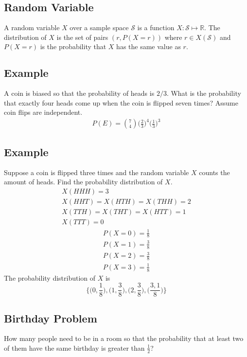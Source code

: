 \documentclass{article}
\theoremstyle{mytheoremstyle}
\theoremstyle{mytheoremstyle}
\theoremstyle{myproblemstyle}
\begin{document}
    \subsection*{Random Variable}
    A random variable $X$ over a sample space $\mathcal{S}$ is a function $X:
    \mathcal{S} \mapsto \mathbb{R}$. The distribution of $X$ is the set of pairs
    $(r,P(X=r))$ where $r\in X(\mathcal{S})$ and $P(X=r)$ is the probability
    that $X$ has the same value as $r$.

    \subsection*{Example}
    A coin is biased so that the probability of heads is $2/3$. What is the
    probability that exactly four heads come up when the coin is flipped seven
    times? Assume coin flips are independent.
    \begin{align*}
        P(E) = \binom{7}{4} \Big(\frac{2}{3}\Big)^4 \Big(\frac{1}{3}\Big)^3
    \end{align*}

    \subsection*{Example}
    Suppose a coin is flipped three times and the random variable $X$ counts the
    amount of heads. Find the probability distribution of $X$.
    \begin{align*}
        X(HHH)=3 \\
        X(HHT)=X(HTH)=X(THH) = 2 \\
        X(TTH)=X(THT)=X(HTT)=1 \\
        X(TTT)=0
    \end{align*}
    \begin{align*}
        P(X=0)= \frac{1}{8} \\
        P(X=1)= \frac{3}{8} \\
        P(X=2)= \frac{3}{8} \\
        P(X=3)= \frac{1}{8}
    \end{align*}
    The probability distribution of $X$ is
    \[
        \bigg\{\Big(0, \frac{1}{8}\Big), \Big(1, \frac{3}{8}\Big), \Big(2, \frac{3}{8}\Big), \Big(\frac{3,1}{8}\Big)\bigg\}
    \]

    \subsection*{Birthday Problem}
    How many people need to be in a room so that the probability that at least
    two of them have the same birthday is greater than $\frac{1}{2}$?
\end{document}
